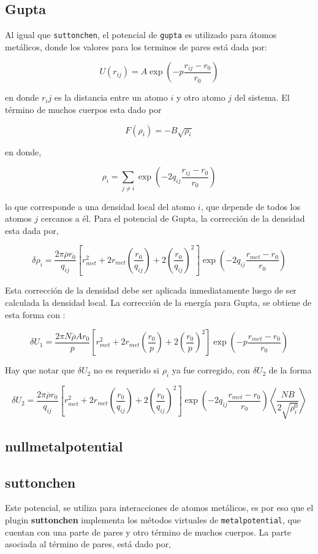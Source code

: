 \subsection{Gupta}

Al igual que \verb|suttonchen|, el potencial de \verb|gupta| es utilizado para
\'atomos met\'alicos, donde los valores para los terminos de pares est\'a dada
por:

$$U(r_{ij}) = A\exp{\left(-p\frac{r_{ij}-r_0}{r_0}\right)}$$

en donde $r_ij$ es la distancia entre un atomo $i$ y otro atomo $j$ del sistema.
El t\'ermino de muchos cuerpos esta dado por

$$F(\rho_{i}) = -B\sqrt{\rho_i}$$

en donde,

$$\rho_i = \sum_{j\neq i} \exp{\left(-2q_{ij}\frac{r_{ij}-r_0}{r_0}\right)}$$

lo que corresponde a una densidad local del atomo $i$, que depende de todos los
atomos $j$ cercanos a \'el. Para el potencial de Gupta, la correcci\'on de la
densidad esta dada por,

$$\delta\rho_i=\frac{2\pi\overline{\rho}r_0}{q_{ij}}\left[r^2_{met}+2r_{met}
\left(\frac{r_0}{q_{ij}}\right)+2\left(\frac{r_0}{q_{ij}}\right)^2\right]\exp{
\left(-2q_{ij}\frac{r_{met}-r_0}{r_0}\right)}$$

Esta correcci\'on de la densidad debe ser aplicada inmediatamente luego de ser
calculada la densidad local. La correcci\'on de la energ\'ia para Gupta, se
obtiene de esta forma con :

$$\delta U_1 = \frac{2\pi N\overline{\rho}A
r_0}{p}\left[r^2_{met}+2r_{met}\left(\frac{r_0}{p}\right)+2\left(\frac{r_0}{p}
\right)^2\right]\exp{\left(-p\frac{r_{met}-r_0}{r_0}\right)}$$

Hay que notar que $\delta U_2$ no es requerido si $\rho_i$ ya fue corregido, con
$\delta U_2$ de la forma

$$\delta U_2 = \frac{2\pi\overline{\rho}
r_0}{q_{ij}}\left[r^2_{met}+2r_{met}\left(\frac{r_0}{q_{ij}}\right)+2\left(\frac
{r_0}{q_{ij}}\right)^2\right]\exp{\left(-2q_{ij}\frac{r_{met}-r_0}{r_0}\right)}
\left<\frac{NB}{2\sqrt{\rho_i^0}}\right>$$

\subsection{nullmetalpotential}

\subsection{suttonchen}
Este potencial, se utiliza para interacciones de atomos met\'alicos, es por eso
que el plugin \textbf{suttonchen} implementa los m\'etodos virtuales de
\verb|metalpotential|, que cuentan con una parte de pares y otro t\'ermino de
muchos cuerpos. La parte asociada al t\'ermino de pares, est\'a dado por,

